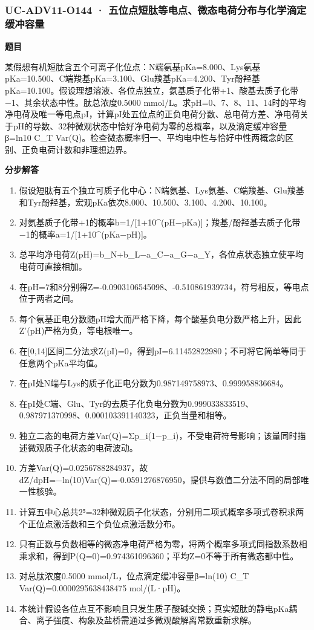 \documentclass[UTF8,11pt,a4paper]{ctexart}
\begin{document}
\subsubsection*{UC-ADV11-O144 · 五位点短肽等电点、微态电荷分布与化学滴定缓冲容量}
\noindent\textbf{题目}\par
某假想有机短肽含五个可离子化位点：N端氨基pKa=8.000、Lys氨基pKa=10.500、C端羧基pKa=3.100、Glu羧基pKa=4.200、Tyr酚羟基pKa=10.100。假设理想溶液、各位点独立，氨基质子化带+1、酸基去质子化带−1、其余状态中性。肽总浓度0.5000 mmol/L。求pH=0、7、8、11、14时的平均净电荷及唯一等电点pI，计算pI处五位点的正负电荷分数、总电荷方差、净电荷关于pH的导数、32种微观状态中恰好净电荷为零的总概率，以及滴定缓冲容量β=ln10 C\_T Var(Q)。检查微态概率归一、平均电中性与恰好中性两概念的区别、正负电荷计数和非理想边界。\par
\medskip\noindent\textbf{分步解答}
\begin{enumerate}
\item 假设短肽有五个独立可质子化中心：N端氨基、Lys氨基、C端羧基、Glu羧基和Tyr酚羟基，宏观pKa依次8.000、10.500、3.100、4.200、10.100。
\item 对氨基质子化带+1的概率b=1/[1+10\textasciicircum{}(pH−pKa)]；羧基/酚羟基去质子化带−1的概率a=1/[1+10\textasciicircum{}(pKa−pH)]。
\item 总平均净电荷Z(pH)=b\_N+b\_L−a\_C−a\_G−a\_Y，各位点状态独立使平均电荷可直接相加。
\item 在pH=7和8分别得Z=-0.0903106545098、-0.510861939734，符号相反，等电点位于两者之间。
\item 每个氨基正电分数随pH增大而严格下降，每个酸基负电分数严格上升，因此Z'(pH)严格为负，等电根唯一。
\item 在[0,14]区间二分法求Z(pI)=0，得到pI=6.11452822980；不可将它简单等同于任意两个pKa平均值。
\item 在pI处N端与Lys的质子化正电分数为0.987149758973、0.999958836684。
\item 在pI处C端、Glu、Tyr的去质子化负电分数为0.999033833519、0.987971370998、0.000103391140323，正负当量和相等。
\item 独立二态的电荷方差Var(Q)=Σp\_i(1−p\_i)，不受电荷符号影响；该量同时描述微观质子化状态的电荷波动。
\item 方差Var(Q)=0.0256788284937，故dZ/dpH=−ln(10)Var(Q)=-0.0591276876950，提供与数值二分法不同的局部唯一性核验。
\item 计算五中心总共2⁵=32种微观质子化状态，分别用二项式概率多项式卷积求两个正位点激活数和三个负位点激活数分布。
\item 只有正数与负数相等的微态净电荷严格为零，将两个概率多项式同指数系数相乘求和，得到P(Q=0)=0.974361096360；平均Z=0不等于所有微态都中性。
\item 对总肽浓度0.5000 mmol/L，位点滴定缓冲容量β=ln(10) C\_T Var(Q)=0.0000295638438475 mol/(L·pH)。
\item 本统计假设各位点互不影响且只发生质子酸碱交换；真实短肽的静电pKa耦合、离子强度、构象及盐桥需通过多微观酸解离常数重新求解。
\end{enumerate}
\end{document}
